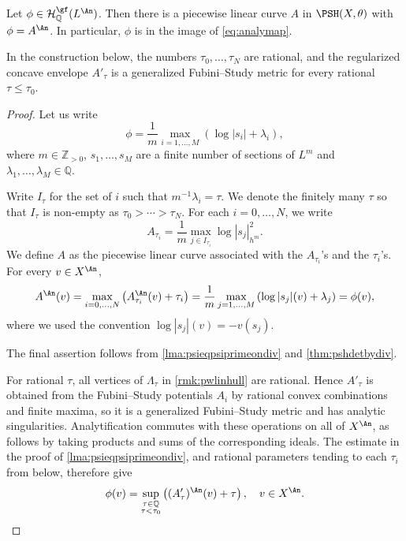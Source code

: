 \begin{lemma}\label{lma:gfinimage}
    Let $\phi \in \mathcal{H}^{\gf}_{\mathbb{Q}}(L^{\An})$. Then there is a piecewise linear curve $A$ in $\PSH(X,\theta)$ with $\phi=A^{\An}$. In particular, $\phi$ is in the image of \eqref{eq:analymap}.
\end{lemma}
In the construction below, the numbers $\tau_0,\ldots,\tau_N$ are rational, and the regularized concave envelope $A'_{\tau}$ is a generalized Fubini--Study metric for every rational $\tau\leq\tau_0$.
\begin{proof}
     Let us write
    \begin{equation}\label{eq:phiintominversemax}
        \phi=\frac{1}{m}\max_{i=1,\ldots,M} \left(\log|s_i|+\lambda_i\right),
    \end{equation}
where $m\in \mathbb{Z}_{>0}$, $s_{1},\ldots, s_M$ are a finite number of sections of $L^m$ and $\lambda_1,\ldots,\lambda_M\in \mathbb{Q}$.

Write $I_{\tau}$ for the set of $i$ such that $m^{-1}\lambda_i=\tau$. We denote the finitely many $\tau$ so that $I_{\tau}$ is non-empty as $\tau_0> \cdots > \tau_N$.
For each $i=0,\ldots,N$, we write
\[
A_{\tau_i}=\frac{1}{m}\max_{j\in I_{\tau_i}} \log |s_j|^2_{h^m}.
\]
We define $A$ as the piecewise linear curve associated with the $A_{\tau_i}$'s and the $\tau_i$'s. For every $v\in X^{\An}$,
\[
A^{\An}(v)=\max_{i=0,\ldots,N}\left(A_{\tau_i}^{\An}(v)+\tau_i\right)
=\frac{1}{m}\max_{j=1,\ldots,M}\left(\log|s_j|(v)+\lambda_j\right)=\phi(v),
\]
where we used the convention $\log|s_j|(v)=-v(s_j)$.

The final assertion follows from \cref{lma:psieqpsiprimeondiv} and \cref{thm:pshdetbydiv}.

For rational $\tau$, all vertices of $\Lambda_{\tau}$ in \cref{rmk:pwlinhull} are rational. Hence $A'_{\tau}$ is obtained from the Fubini--Study potentials $A_i$ by rational convex combinations and finite maxima, so it is a generalized Fubini--Study metric and has analytic singularities. Analytification commutes with these operations on all of $X^{\An}$, as follows by taking products and sums of the corresponding ideals. The estimate in the proof of \cref{lma:psieqpsiprimeondiv}, and rational parameters tending to each $\tau_i$ from below, therefore give
\begin{equation}\label{eq:gf-rational-hull}
\phi(v)=\sup_{\substack{\tau\in\mathbb{Q}\\\tau<\tau_0}}\left((A'_{\tau})^{\An}(v)+\tau\right),\quad v\in X^{\An}.
\end{equation}
\end{proof}


